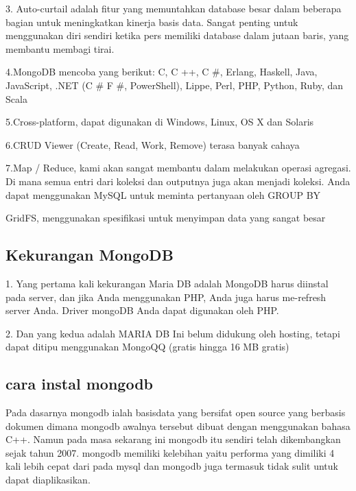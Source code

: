 {3. Auto-curtail adalah fitur yang memuntahkan database besar dalam beberapa bagian untuk meningkatkan kinerja basis data. Sangat penting untuk menggunakan diri sendiri ketika pers memiliki database dalam jutaan baris, yang membantu membagi tirai.

4.MongoDB mencoba yang berikut: C, C ++, C #, Erlang, Haskell, Java, JavaScript, .NET (C # F #, PowerShell), Lippe, Perl, PHP, Python, Ruby, dan Scala

5.Cross-platform, dapat digunakan di Windows, Linux, OS X dan Solaris

6.CRUD Viewer (Create, Read, Work, Remove) terasa banyak cahaya

7.Map / Reduce, kami akan sangat membantu dalam melakukan operasi agregasi. Di mana semua entri dari koleksi dan outputnya juga akan menjadi koleksi. Anda dapat menggunakan MySQL untuk meminta pertanyaan oleh GROUP BY

GridFS, menggunakan spesifikasi untuk menyimpan data yang sangat besar

\subsection {Kekurangan MongoDB}
1.	Yang pertama kali kekurangan Maria DB adalah MongoDB harus diinstal pada server, dan jika Anda menggunakan PHP, Anda juga harus me-refresh server Anda. Driver mongoDB Anda dapat digunakan oleh PHP.

2.	Dan yang kedua adalah MARIA DB Ini belum didukung oleh hosting, tetapi dapat ditipu menggunakan MongoQQ (gratis hingga 16 MB gratis)

\subsection {cara instal mongodb}
	Pada dasarnya mongodb ialah basisdata yang bersifat open source yang berbasis dokumen dimana mongodb awalnya tersebut dibuat dengan menggunakan bahasa C++. Namun pada masa sekarang ini mongodb itu sendiri telah dikembangkan sejak tahun 2007. mongodb memiliki kelebihan yaitu performa yang dimiliki 4 kali lebih cepat dari pada mysql dan mongodb juga termasuk tidak sulit untuk dapat diaplikasikan.
	
}
